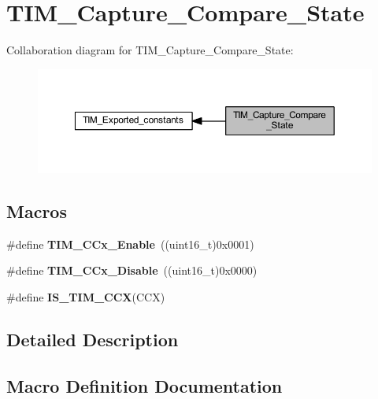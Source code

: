 \hypertarget{group___t_i_m___capture___compare___state}{}\section{T\+I\+M\+\_\+\+Capture\+\_\+\+Compare\+\_\+\+State}
\label{group___t_i_m___capture___compare___state}
Collaboration diagram for T\+I\+M\+\_\+\+Capture\+\_\+\+Compare\+\_\+\+State\+:\nopagebreak
\begin{figure}[H]
\begin{center}
\leavevmode
\includegraphics[width=350pt]{group___t_i_m___capture___compare___state}
\end{center}
\end{figure}
\subsection*{Macros}
\begin{DoxyCompactItemize}
\item 
\mbox{\label{group___t_i_m___capture___compare___state_ga6acaeb60dad50ce9799ae9f62ed7719a}} 
\#define {\bfseries T\+I\+M\+\_\+\+C\+Cx\+\_\+\+Enable}~((uint16\+\_\+t)0x0001)
\item 
\mbox{\label{group___t_i_m___capture___compare___state_gaa1441f66393b9daa9f97efb29b364cd3}} 
\#define {\bfseries T\+I\+M\+\_\+\+C\+Cx\+\_\+\+Disable}~((uint16\+\_\+t)0x0000)
\item 
\#define {\bfseries I\+S\+\_\+\+T\+I\+M\+\_\+\+C\+CX}(C\+CX)
\end{DoxyCompactItemize}


\subsection{Detailed Description}


\subsection{Macro Definition Documentation}
\mbox{\label{group___t_i_m___capture___compare___state_ga5b7461e8c9c25f6fa082118c95b02ba1}} 
